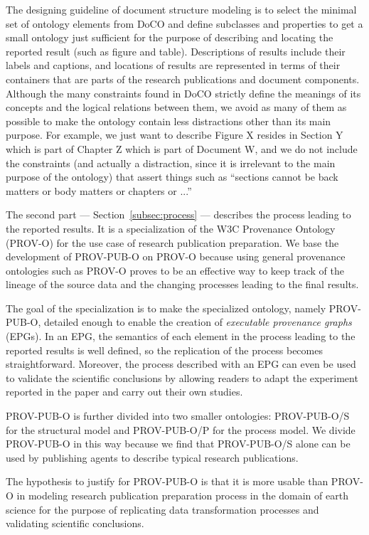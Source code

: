 The designing guideline of document structure modeling is to select the minimal set of ontology elements from DoCO and define subclasses and properties to get a small ontology just sufficient for the purpose of describing and locating the reported result (such as figure and table). Descriptions of results include their labels and captions, and locations of results are represented in terms of their containers that are parts of the research publications and document components. Although the many constraints found in DoCO strictly define the meanings of its concepts and the logical relations between them, we avoid as many of them as possible to make the ontology contain less distractions other than its main purpose. For example, we just want to describe Figure X resides in Section Y which is part of Chapter Z which is part of Document W, and we do not include the constraints (and actually a distraction, since it is irrelevant to the main purpose of the ontology) that assert things such as ``sections cannot be back matters or body matters or chapters or ...'' 

The second part --- Section~\ref{subsec:process} --- describes the process leading to the reported results. It is a specialization of the W3C Provenance Ontology (PROV-O) for the use case of research publication preparation. We base the development of PROV-PUB-O on PROV-O because using general provenance ontologies such as PROV-O proves to be an effective way to keep track of the lineage of the source data and the changing processes leading to the final results. 

The goal of the specialization is to make the specialized ontology, namely PROV-PUB-O, detailed enough to enable the creation of \emph{executable provenance graphs} (EPGs). In an EPG, the semantics of each element in the process leading to the reported results is well defined, so the replication of the process becomes straightforward. Moreover, the process described with an EPG can even be used to validate the scientific conclusions by allowing readers to adapt the experiment reported in the paper and carry out their own studies.

PROV-PUB-O is further divided into two smaller ontologies: PROV-PUB-O/S for the structural model and PROV-PUB-O/P for the process model. We divide PROV-PUB-O in this way because we find that PROV-PUB-O/S alone can be used by publishing agents to describe typical research publications. 

The hypothesis to justify for PROV-PUB-O is that it is more usable than PROV-O in modeling research publication preparation process in the domain of earth science for the purpose of replicating data transformation processes and validating scientific conclusions.

